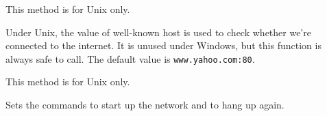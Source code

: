 This method is for Unix only.

Under Unix, the value of well-known host is used to check whether we're
connected to the internet. It is unused under Windows, but this function
is always safe to call. The default value is {\tt www.yahoo.com:80}.

\label{wxdialupmanagersetconnectcommand}


This method is for Unix only.

Sets the commands to start up the network and to hang up again.



